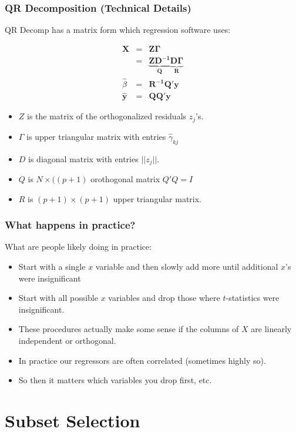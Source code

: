 \begin{frame}
\frametitle{QR Decomposition (Technical Details)}
QR Decomp has a matrix form which regression software uses:

\begin{eqnarray*}
\mathbf{X} &=& \mathbf{Z \Gamma} \\
    &=& \mathbf{\underbrace{Z D^{-1}}_{Q} \underbrace{D \Gamma}_{R}} \\
    \hat{\beta} &=& \mathbf{R^{-1} Q' y}\\
    \hat{\mathbf{y}} &=& \mathbf{Q Q'} \mathbf{y}
\end{eqnarray*}
\begin{itemize}
\item $Z$ is the matrix of the orthogonalized residuals $z_j$'s.
\item $\Gamma$ is upper triangular matrix with entries $\hat{\gamma}_{kj}$
\item $D$ is diagonal matrix with entries $|| z_j ||$.
\item $Q$ is $N \times ((p+1)$ orothogonal matrix $Q'Q = I$ 
\item $R$ is $(p+1) \times (p+1)$ upper triangular matrix.
\end{itemize}
\end{frame}


\begin{frame}
\frametitle{What happens in practice?}
What are people likely doing in practice:
\begin{itemize}
\item Start with a single $x$ variable and then slowly add more until additional $x$'s were insignificant
\item Start with all possible $x$ variables and drop those where $t$-statistics were insignificant.
\item These procedures actually make some sense if the columns of $X$ are \alert{linearly independent} or \alert{orthogonal}.
\item In practice our regressors are often correlated (sometimes highly so).
\item So then it matters which variables you drop first, etc. 
\end{itemize}
\end{frame}
    

\section{Subset Selection}

